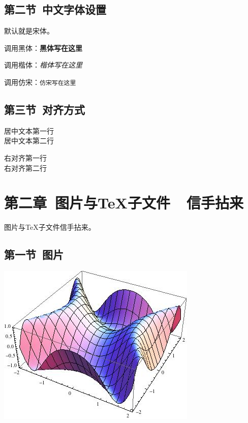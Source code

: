 \documentclass{ctexart}
\begin{document}
\subsection{第二节\ 中文字体设置}

默认就是宋体。\par
调用黑体：\textbf{黑体写在这里}\par
调用楷体：\textit{楷体写在这里}\par
调用仿宋：\texttt{仿宋写在这里}\par

\subsection{第三节\ 对齐方式}


\begin{center} 
居中文本第一行\\
居中文本第二行\\
\end{center}

\begin{flushright}
右对齐第一行\\
右对齐第二行\\
\end{flushright}




\section{第二章\ 图片与TeX子文件\ \ 信手拈来}

图片与TeX子文件信手拈来。

\subsection{第一节\ 图片}

\begin{center}
\includegraphics[scale=0.4]{include_picture/picture.jpg}\par
\end{center}
\end{document}
